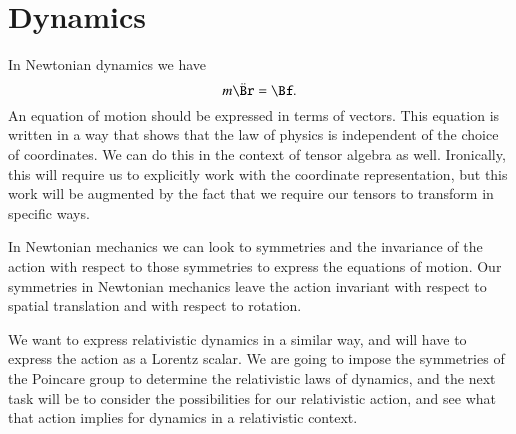 %
%
\section{Dynamics}

In Newtonian dynamics we have
%
\begin{equation}\label{eqn:relativisticElectrodynamicsL6:250}
m \ddot{\Br} = \Bf.
\end{equation}
%
An equation of motion should be expressed in terms of vectors.  This equation is written in a way that shows that the law of physics is independent of the choice of coordinates.  We can do this in the context of tensor algebra as well.  Ironically, this will require us to explicitly work with the coordinate representation, but this work will be augmented by the fact that we require our tensors to transform in specific ways.

In Newtonian mechanics we can look to symmetries and the invariance of the action with respect to those symmetries to express the equations of motion.  Our symmetries in Newtonian mechanics leave the action invariant with respect to spatial translation and with respect to rotation.

We want to express relativistic dynamics in a similar way, and will have to express the action as a Lorentz scalar.  We are going to impose the symmetries of the Poincare group to determine the relativistic laws of dynamics, and the next task will be to consider the possibilities for our relativistic action, and see what that action implies for dynamics in a relativistic context.
